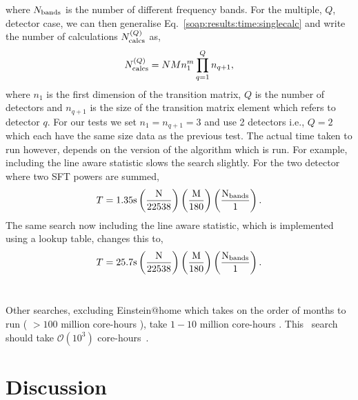 where  $N_{\rm{bands}}$ is the number of different frequency
bands.
For the multiple, $Q$, detector case, we can then generalise Eq.~\ref{soap:results:time:singlecalc} and write the number of calculations $N^{(Q)}_{\rm{calcs}}$ as,
\begin{equation}
\label{soap:results:time:numbercalcs}
N^{(Q)}_{\rm{calcs}} = NMn_{1}^{m} \prod_{q=1}^{Q}n_{q+1},
\end{equation}
where $n_1$ is the first dimension of the transition matrix, $Q$ is the number of detectors and $n_{q+1}$ is the size of the transition matrix element which refers to detector $q$.
For our tests we set $n_1=n_{q+1}=3$ and use 2 detectors i.e., $Q=2$ which each have the same size data as the previous test. The actual time taken to run however, depends on the version of the algorithm which is run. For example, including the line aware statistic slows the search slightly.
For the two detector ~ where two \gls{SFT} powers are summed,
\begin{equation}
T = 1.35 \rm{s}\left( \frac{N}{22538}\right) \left( \frac{M}{180}\right) \left( \frac{N_{\rm{bands}}}{1}\right).
\end{equation}
The same search now including the line aware statistic, which is implemented using a lookup table, changes this to,
\begin{equation}
T = 25.7 \rm{s}\left( \frac{N}{22538}\right) \left( \frac{M}{180}\right) \left( \frac{N_{\rm{bands}}}{1}\right).
\end{equation}
~

Other searches, excluding Einstein@home which takes on the order of months to
run ( $>100$ million core-hours \citep{walsh2016ComparisonMethods}), take
$1-10$ million core-hours \citep{walsh2016ComparisonMethods}.
This~ search
should take $\mathcal{O}(10^3)$ core-hours~.

\section{\label{soap:dicussion}Discussion}

